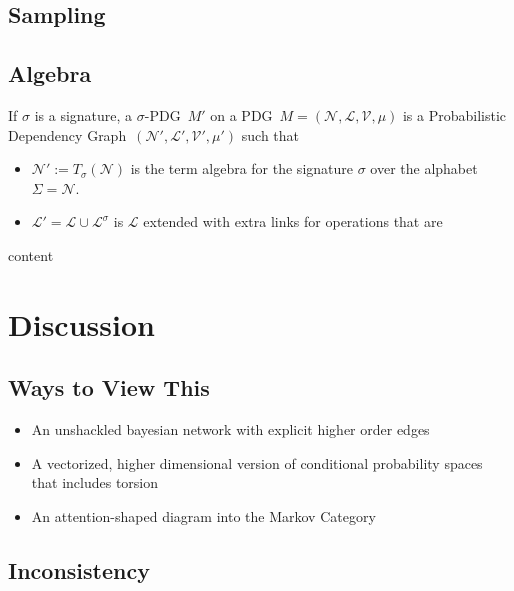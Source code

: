 \documentclass{article}
\newcommand\changeon{\color{note-fg} }
\newcommand\changeoff{\color{black} }
\newcommand{\modelname}{Probabilistic Dependency Graph}
\newcommand{\MN}{PDG}
\begin{document}
	\subsection{Sampling}

	\begin{vcat}
		\section{Algebra}\label{sec:algebra}
		\begin{defn}
			If $\sigma$ is a signature, a $\sigma$-\MN\ $M'$ on a \MN\ $M=(\mathcal N, \mathcal L, \mathcal V, \mu)$ is a \modelname\ $(\mathcal N', \mathcal L', \mathcal V', \mu')$ such that
			\begin{itemize}
				\item $\mathcal N':= T_\sigma(\mathcal N)$ is the term algebra for the signature $\sigma$ over the alphabet $\Sigma = \mathcal N$.
				\item $\mathcal L' = \mathcal L \cup \mathcal L^\sigma$ is $\mathcal L$ extended with extra links for operations that are 
			\end{itemize}
		\end{defn}
		
		\begin{example}
			content
		\end{example}
		
	\end{vcat}
	\section{Discussion}
	
	\changeon
	\subsection{Ways to View This}
	\begin{itemize}
		\item An unshackled bayesian network with explicit higher order edges
		\item A vectorized, higher dimensional version of conditional probability spaces that includes torsion
		\item An attention-shaped diagram into the Markov Category
	\end{itemize}	
	\changeoff

	\subsection{Inconsistency} \label{sec:consistency-ethos}
\end{document}

